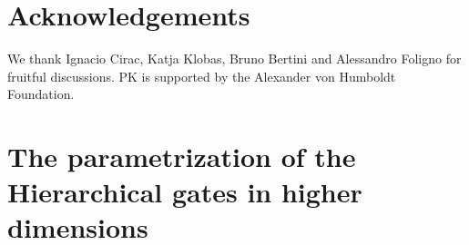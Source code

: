 \documentclass[aps,prx,twocolumn,notitlepage,nofootinbib,nobalancelastpage]{revtex4-2}
\theoremstyle{break}
\newcommand{\1}{\mathbbm{1}}
\theoremstyle{plain}
\theoremstyle{plain}
\theoremstyle{plain}
\newcommand{\pk}[1]{{\color{blue}[#1]}}
\begin{document}
\section*{Acknowledgements}
We thank Ignacio Cirac, Katja Klobas, Bruno Bertini and Alessandro Foligno  for fruitful discussions.
PK is supported by the Alexander von Humboldt Foundation.
\vspace{.5cm}


\appendix
\section{The parametrization of the Hierarchical gates in higher dimensions}\label{sec:appendixA}
\end{document}
